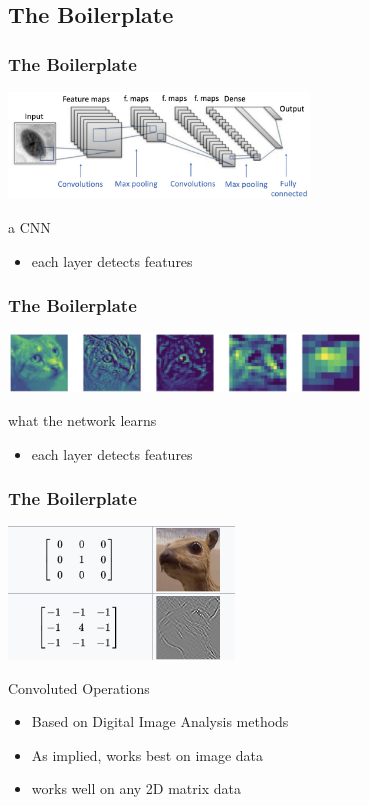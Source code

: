 \documentclass[aspectratio=169,usenames,dvipsnames]{beamer}
\begin{document}
\subsection{The Boilerplate}
\begin{frame}
    \frametitle{The Boilerplate}
    \centering
    \includegraphics[width=0.6\textwidth]{Figures/basicCNN.png}
    \begin{block}{a CNN}
        \begin{itemize}
            \item each layer detects features        
        \end{itemize}
    \end{block}
\end{frame}
\begin{frame}
    \frametitle{The Boilerplate}
    \centering
    \includegraphics[width=0.7\textwidth]{Figures/catfeat.png}
    \begin{block}{what the network learns}
        \begin{itemize}
            \item each layer detects features        
        \end{itemize}
    \end{block}
\end{frame}
\begin{frame}
    \frametitle{The Boilerplate}
    \centering
    \includegraphics[width=0.45\textwidth]{Figures/kernel.png}
    \vspace{-1\baselineskip}
    \begin{block}{Convoluted Operations}
        \begin{itemize}
            \item Based on Digital Image Analysis methods
            \item As implied, works best on image data
            \item works well on any 2D matrix data
        \end{itemize}
    \end{block}
\end{frame}
\end{document}
